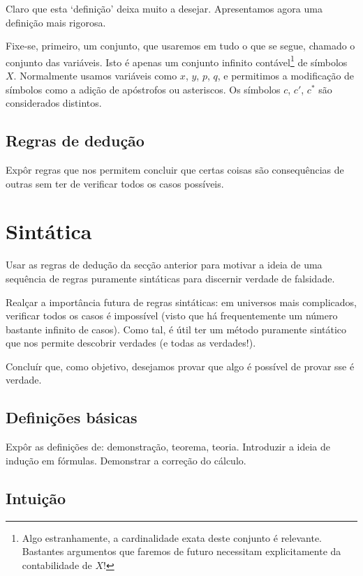 \documentclass{report}
\theoremstyle{definition}
\theoremstyle{remark}
\begin{document}
	Claro que esta `definição' deixa muito a desejar. Apresentamos agora uma definição mais rigorosa.
	
	Fixe-se, primeiro, um conjunto, que usaremos em tudo o que se segue, chamado o conjunto das variáveis. Isto é apenas um conjunto infinito contável\footnote{Algo estranhamente, a cardinalidade exata deste conjunto é relevante. Bastantes argumentos que faremos de futuro necessitam explicitamente da contabilidade de $X$!} de símbolos $X$. Normalmente usamos variáveis como $x$, $y$, $p$, $q$, e permitimos a modificação de símbolos como a adição de apóstrofos ou asteriscos. Os símbolos $c$, $c'$, $c^*$ são considerados distintos.
	
	
	
	\subsection{Regras de dedução}
	
	Expôr regras que nos permitem concluir que certas coisas são consequências de outras sem ter de verificar todos os casos possíveis.
	
	\section{Sintática}
	
	Usar as regras de dedução da secção anterior para motivar a ideia de uma sequência de regras puramente sintáticas para discernir verdade de falsidade.
	
	Realçar a importância futura de regras sintáticas: em universos mais complicados, verificar todos os casos é impossível (visto que há frequentemente um número bastante infinito de casos). Como tal, é útil ter um método puramente sintático que nos permite descobrir verdades (e todas as verdades!).
	
	Concluír que, como objetivo, desejamos provar que algo é possível de provar sse é verdade.
	
	\subsection{Definições básicas}
	
	Expôr as definições de: demonstração, teorema, teoria. Introduzir a ideia de indução em fórmulas. Demonstrar a correção do cálculo.
	
	\subsection{Intuição}
	
\end{document}
